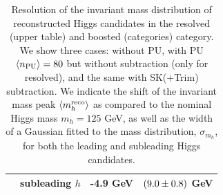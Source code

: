 \begin{table}[t]
\begin{tabular}{|c|c|c|c|}
          & subleading $h$   & -4.9 GeV  &  $\left( 9.0\pm 0.8 \right)$ GeV \\
        \hline
        \end{tabular}
      \caption{\label{tab:massresolution}
        Resolution of the invariant mass distribution of
        reconstructed Higgs candidates in the resolved (upper table)
        and boosted (categories) category.
        We show three cases: without PU, with PU $\left\langle n_{\rm PU}\right\rangle=80$
        but without subtraction (only for resolved),
        and the same with SK(+Trim) subtraction.
        We indicate the shift of the invariant
        mass peak $\left\langle m_h^{\rm reco}\right\rangle$ as compared
        to the nominal Higgs mass $m_h=125$ GeV, as well as the width
        of a Gaussian fitted to the mass distribution, $\sigma_{m_h}$,
        for both the leading and subleading Higgs candidates.
      }
    \end{table}


